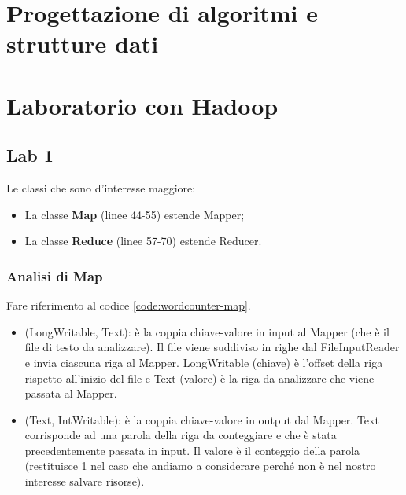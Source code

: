 \documentclass[italian,10pt,a4paper]{report}
\begin{document}
	\chapter{Progettazione di algoritmi e strutture dati}
	\chapter{Laboratorio con Hadoop}
	\section{Lab 1}
	
	Le classi che sono d'interesse maggiore:
	\begin{itemize}
		\item La classe \textbf{Map} (linee 44-55) estende Mapper;
		\item La classe \textbf{Reduce} (linee 57-70) estende Reducer.
	\end{itemize}
	\newpage
	
		\subsection{Analisi di Map}
		Fare riferimento al codice \ref{code:wordcounter-map}.
		
		\begin{itemize}
			\item (LongWritable, Text): è la coppia chiave-valore in input al Mapper (che è il file di testo da analizzare). Il file viene suddiviso in righe dal FileInputReader e invia ciascuna riga al Mapper. LongWritable (chiave) è l'offset della riga rispetto all'inizio del file e Text (valore) è la riga da analizzare che viene passata al Mapper.
			\item (Text, IntWritable): è la coppia chiave-valore in output dal Mapper. Text corrisponde ad una parola della riga da conteggiare e che è stata precedentemente passata in input. Il valore è il conteggio della parola (restituisce 1 nel caso che andiamo a considerare perché non è nel nostro interesse salvare risorse).
		\end{itemize}
		
\end{document}
